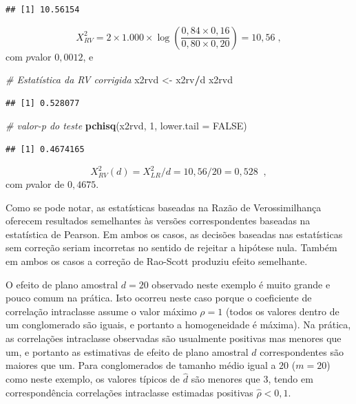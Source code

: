 \documentclass[]{book}
\newenvironment{Shaded}{\begin{snugshade}}{\end{snugshade}}
\newcommand{\KeywordTok}[1]{\textcolor[rgb]{0.13,0.29,0.53}{\textbf{#1}}}
\newcommand{\DataTypeTok}[1]{\textcolor[rgb]{0.13,0.29,0.53}{#1}}
\newcommand{\DecValTok}[1]{\textcolor[rgb]{0.00,0.00,0.81}{#1}}
\newcommand{\StringTok}[1]{\textcolor[rgb]{0.31,0.60,0.02}{#1}}
\newcommand{\CommentTok}[1]{\textcolor[rgb]{0.56,0.35,0.01}{\textit{#1}}}
\newcommand{\OtherTok}[1]{\textcolor[rgb]{0.56,0.35,0.01}{#1}}
\newcommand{\OperatorTok}[1]{\textcolor[rgb]{0.81,0.36,0.00}{\textbf{#1}}}
\newcommand{\NormalTok}[1]{#1}
\theoremstyle{definition}
\theoremstyle{definition}
\theoremstyle{definition}
\theoremstyle{remark}
\begin{document}
\begin{verbatim}
## [1] 10.56154
\end{verbatim}

\[
X_{RV}^{2}=2\times 1.000\times \log \left( \frac{0,84\times 0,16}{0,80\times
0,20}\right) =10,56\;, 
\] com \(p\)valor \(0,0012\), e

\begin{Shaded}
\begin{Highlighting}[]
\CommentTok{# Estatística da RV corrigida}
\NormalTok{x2rvd <-}\StringTok{ }\NormalTok{x2rv}\OperatorTok{/}\NormalTok{d}
\NormalTok{x2rvd}
\end{Highlighting}
\end{Shaded}

\begin{verbatim}
## [1] 0.528077
\end{verbatim}

\begin{Shaded}
\begin{Highlighting}[]
\CommentTok{# valor-p do teste}
\KeywordTok{pchisq}\NormalTok{(x2rvd, }\DecValTok{1}\NormalTok{, }\DataTypeTok{lower.tail =} \OtherTok{FALSE}\NormalTok{)}
\end{Highlighting}
\end{Shaded}

\begin{verbatim}
## [1] 0.4674165
\end{verbatim}

\[
X_{RV}^{2}(d)=X_{LR}^{2}/d=10,56/20=0,528\;\;, 
\] com \(p\)valor de \(0,4675\).

Como se pode notar, as estatísticas baseadas na Razão de Verossimilhança
oferecem resultados semelhantes às versões correspondentes baseadas na
estatística de Pearson. Em ambos os casos, as decisões baseadas nas
estatísticas sem correção seriam incorretas no sentido de rejeitar a
hipótese nula. Também em ambos os casos a correção de Rao-Scott produziu
efeito semelhante.

O efeito de plano amostral \(d=20\) observado neste exemplo é muito
grande e pouco comum na prática. Isto ocorreu neste caso porque o
coeficiente de correlação intraclasse assume o valor máximo \(\rho =1\)
(todos os valores dentro de um conglomerado são iguais, e portanto a
homogeneidade é máxima). Na prática, as correlações intraclasse
observadas são usualmente positivas mas menores que um, e portanto as
estimativas de efeito de plano amostral \(\widehat{d}\) correspondentes
são maiores que um. Para conglomerados de tamanho médio igual a \(20\)
(\(m=20\)) como neste exemplo, os valores típicos de \(\widehat{d}\) são
menores que \(3\), tendo em correspondência correlações intraclasse
estimadas positivas \(\widehat{\rho }<0,1\).
\end{document}
